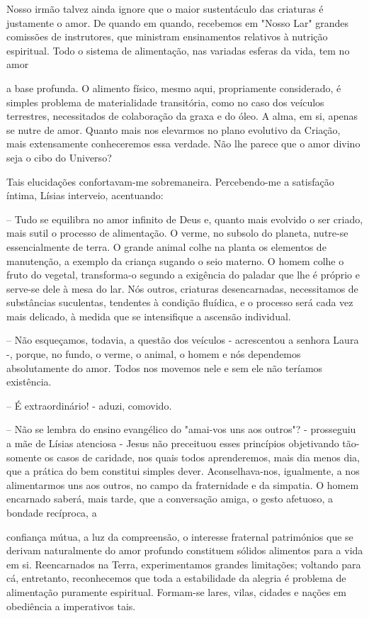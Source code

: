 \documentclass[portuguese,12pt,a4paper]{scrbook}
\begin{document}
	Nosso irmão talvez ainda ignore que o maior sustentáculo das criaturas é justamente o amor. De quando em quando, recebemos em "Nosso Lar" grandes comissões de instrutores, que ministram ensinamentos relativos à nutrição espiritual. Todo o sistema de alimentação, nas variadas esferas da vida, tem no amor
	
	
	a base profunda. O alimento físico, mesmo aqui, propriamente considerado, é simples problema de materialidade transitória, como no caso dos veículos terrestres, necessitados de colaboração da graxa e do óleo. A alma, em si, apenas se nutre de amor. Quanto mais nos elevarmos no plano evolutivo da Criação, mais extensamente conheceremos essa verdade. Não lhe parece que o amor divino seja o cibo do Universo?
	
	Tais elucidações confortavam-me sobremaneira. Percebendo-me a satisfação íntima, Lísias interveio, acentuando:
	
	– Tudo se equilibra no amor infinito de Deus e, quanto mais evolvido o ser criado, mais sutil o processo de alimentação. O verme, no subsolo do planeta, nutre-se essencialmente de terra. O grande animal colhe na planta os elementos de manutenção, a exemplo da criança sugando o seio materno. O homem colhe o fruto do vegetal, transforma-o segundo a exigência do paladar que lhe é próprio e serve-se dele à mesa do lar. Nós outros, criaturas desencarnadas, necessitamos de substâncias suculentas, tendentes à condição fluídica, e o processo será cada vez mais delicado, à medida que se intensifique a ascensão individual.
	
	– Não esqueçamos, todavia, a questão dos veículos - acrescentou a senhora Laura -, porque, no fundo, o verme, o animal, o homem e nós dependemos absolutamente do amor. Todos nos movemos nele e sem ele não teríamos existência.
	
	– É extraordinário! - aduzi, comovido.
	
	– Não se lembra do ensino evangélico do "amai-vos uns aos outros"? - prosseguiu a mãe de Lísias atenciosa - Jesus não preceituou esses princípios objetivando tão-somente os casos de caridade, nos quais todos aprenderemos, mais dia menos dia, que a prática do bem constitui simples dever. Aconselhava-nos, igualmente, a nos alimentarmos uns aos outros, no campo da fraternidade e da simpatia. O homem encarnado saberá, mais tarde, que a conversação amiga, o gesto afetuoso, a bondade recíproca, a
	
	
	confiança mútua, a luz da compreensão, o interesse fraternal patrimónios que se derivam naturalmente do amor profundo constituem sólidos alimentos para a vida em si. Reencarnados na Terra, experimentamos grandes limitações; voltando para cá, entretanto, reconhecemos que toda a estabilidade da alegria é problema de alimentação puramente espiritual. Formam-se lares, vilas, cidades e nações em obediência a imperativos tais.
	
\end{document}
